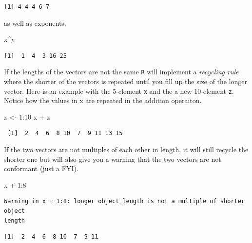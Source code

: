 \documentclass[
  letterpaper,
]{book}
\newenvironment{Shaded}{\begin{snugshade}}{\end{snugshade}}
\newcommand{\DecValTok}[1]{\textcolor[rgb]{0.68,0.00,0.00}{#1}}
\newcommand{\NormalTok}[1]{\textcolor[rgb]{0.00,0.23,0.31}{#1}}
\newcommand{\OtherTok}[1]{\textcolor[rgb]{0.00,0.23,0.31}{#1}}
\newcommand{\SpecialCharTok}[1]{\textcolor[rgb]{0.37,0.37,0.37}{#1}}
\begin{document}
\begin{verbatim}
[1] 4 4 4 6 7
\end{verbatim}

as well as exponents.

\begin{Shaded}
\begin{Highlighting}[]
\NormalTok{x}\SpecialCharTok{\^{}}\NormalTok{y}
\end{Highlighting}
\end{Shaded}

\begin{verbatim}
[1]  1  4  3 16 25
\end{verbatim}

If the lengths of the vectors are not the same \texttt{R} will implement
a \emph{recycling rule} where the shorter of the vectors is repeated
until you fill up the size of the longer vector. Here is an example with
the 5-element \texttt{x} and the a new 10-element \texttt{z}. Notice how
the values in x are repeated in the addition operaiton.

\begin{Shaded}
\begin{Highlighting}[]
\NormalTok{z }\OtherTok{\textless{}{-}} \DecValTok{1}\SpecialCharTok{:}\DecValTok{10}
\NormalTok{x }\SpecialCharTok{+}\NormalTok{ z}
\end{Highlighting}
\end{Shaded}

\begin{verbatim}
 [1]  2  4  6  8 10  7  9 11 13 15
\end{verbatim}

If the two vectors are not multiples of each other in length, it will
still recycle the shorter one but will also give you a warning that the
two vectors are not conformant (just a FYI).

\begin{Shaded}
\begin{Highlighting}[]
\NormalTok{x }\SpecialCharTok{+} \DecValTok{1}\SpecialCharTok{:}\DecValTok{8}
\end{Highlighting}
\end{Shaded}

\begin{verbatim}
Warning in x + 1:8: longer object length is not a multiple of shorter object
length
\end{verbatim}

\begin{verbatim}
[1]  2  4  6  8 10  7  9 11
\end{verbatim}
\end{document}
